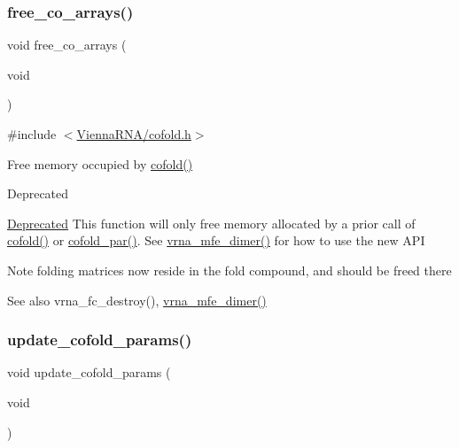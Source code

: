\subsubsection{\texorpdfstring{free\+\_\+co\+\_\+arrays()}{free\_co\_arrays()}}
{\footnotesize\ttfamily void free\+\_\+co\+\_\+arrays (\begin{DoxyParamCaption}\item[{void}]{ }\end{DoxyParamCaption})}



{\ttfamily \#include $<$\hyperlink{cofold_8h}{Vienna\+R\+N\+A/cofold.\+h}$>$}



Free memory occupied by \hyperlink{group__mfe__global__deprecated_gabc8517f22cfe70595ee81fc837910d52}{cofold()} 

\begin{DoxyRefDesc}{Deprecated}
\item[\hyperlink{deprecated__deprecated000032}{Deprecated}]This function will only free memory allocated by a prior call of \hyperlink{group__mfe__global__deprecated_gabc8517f22cfe70595ee81fc837910d52}{cofold()} or \hyperlink{group__mfe__global__deprecated_ga7612cfeeb1b793f1e4179b1eb53df1f3}{cofold\+\_\+par()}. See \hyperlink{group__mfe__global_gaab22d10c1190f205f16a77cab9d5d3ee}{vrna\+\_\+mfe\+\_\+dimer()} for how to use the new A\+PI\end{DoxyRefDesc}


\begin{DoxyNote}{Note}
folding matrices now reside in the fold compound, and should be free\textquotesingle{}d there 
\end{DoxyNote}
\begin{DoxySeeAlso}{See also}
vrna\+\_\+fc\+\_\+destroy(), \hyperlink{group__mfe__global_gaab22d10c1190f205f16a77cab9d5d3ee}{vrna\+\_\+mfe\+\_\+dimer()} 
\end{DoxySeeAlso}
\mbox{\label{group__mfe__global__deprecated_ga4fcbf34e77b99bfbb2333d2ab0c41a57}} 
\subsubsection{\texorpdfstring{update\+\_\+cofold\+\_\+params()}{update\_cofold\_params()}}
{\footnotesize\ttfamily void update\+\_\+cofold\+\_\+params (\begin{DoxyParamCaption}\item[{void}]{ }\end{DoxyParamCaption})}



